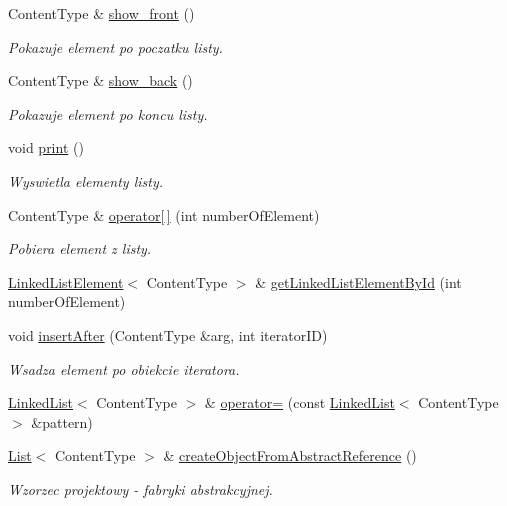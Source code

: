 \begin{DoxyCompactItemize}
Content\-Type \& \hyperlink{class_linked_list_a2dcb9f488e5d179e89283a3f499acb76}{show\-\_\-front} ()
\begin{DoxyCompactList}\small\item\em Pokazuje element po poczatku listy. \end{DoxyCompactList}\item 
Content\-Type \& \hyperlink{class_linked_list_a437b5a0b96ab11f75e0391c76770186a}{show\-\_\-back} ()
\begin{DoxyCompactList}\small\item\em Pokazuje element po koncu listy. \end{DoxyCompactList}\item 
void \hyperlink{class_linked_list_a245ba50906c85c1765a5f611d3f3b6c0}{print} ()
\begin{DoxyCompactList}\small\item\em Wyswietla elementy listy. \end{DoxyCompactList}\item 
Content\-Type \& \hyperlink{class_linked_list_ad99e35cef5826d1cd456713ff8358a86}{operator\mbox{[}$\,$\mbox{]}} (int number\-Of\-Element)
\begin{DoxyCompactList}\small\item\em Pobiera element z listy. \end{DoxyCompactList}\item 
\hyperlink{class_linked_list_element}{Linked\-List\-Element}$<$ Content\-Type $>$ \& \hyperlink{class_linked_list_a32febc46a989c7af9bf8043da069e7df}{get\-Linked\-List\-Element\-By\-Id} (int number\-Of\-Element)
\item 
void \hyperlink{class_linked_list_aa882477023311c1400a724edd415e362}{insert\-After} (Content\-Type \&arg, int iterator\-I\-D)
\begin{DoxyCompactList}\small\item\em Wsadza element po obiekcie iteratora. \end{DoxyCompactList}\item 
\hyperlink{class_linked_list}{Linked\-List}$<$ Content\-Type $>$ \& \hyperlink{class_linked_list_a0dc224aa9930d4cbd80ecbd15c12b6d3}{operator=} (const \hyperlink{class_linked_list}{Linked\-List}$<$ Content\-Type $>$ \&pattern)
\item 
\hyperlink{class_list}{List}$<$ Content\-Type $>$ \& \hyperlink{class_linked_list_aea53fafbbe620165ec3173ad3566785d}{create\-Object\-From\-Abstract\-Reference} ()
\begin{DoxyCompactList}\small\item\em Wzorzec projektowy -\/ fabryki abstrakcyjnej. \end{DoxyCompactList}\end{DoxyCompactItemize}

